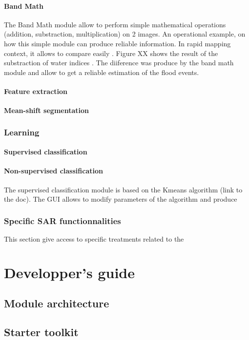 \documentclass{InsightSoftwareGuide}
\begin{document}
\subsection{Band Math}
The Band Math module allow to perform simple mathematical operations (addition, substraction, multiplication) on 2 images. 
An operational example, on how this simple module can produce reliable information.
In rapid mapping context, it allows to compare easily . Figure XX shows the result of the substraction of water indices . The diiference was produce by the band math module
and allow to get a reliable estimation of the flood events.
\subsection{Feature extraction}
\subsection{Mean-shift segmentation}
\section{Learning}
\subsection{Supervised classification}
\subsection{Non-supervised classification}
The supervised classification  module is based on the Kmeans algorithm (link to the doc).
The GUI allows to modify parameters of the algorithm and produce
\section{Specific SAR functionnalities}
This section give access to specific treatments related to the 


\part{Developper's guide}\label{part:developperguide}
\chapter{Module architecture}
\chapter{Starter toolkit}
\end{document}
